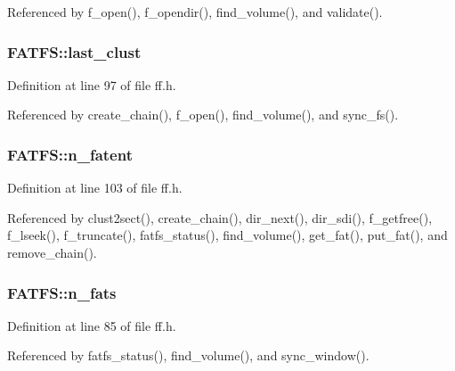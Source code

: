 Referenced by f\-\_\-open(), f\-\_\-opendir(), find\-\_\-volume(), and validate().

\hypertarget{structFATFS_ad315def289218e26ab78ff90fde700d1}{
\subsubsection[{last\-\_\-clust}]{ F\-A\-T\-F\-S\-::last\-\_\-clust}}\label{structFATFS_ad315def289218e26ab78ff90fde700d1}


Definition at line 97 of file ff.\-h.



Referenced by create\-\_\-chain(), f\-\_\-open(), find\-\_\-volume(), and sync\-\_\-fs().

\hypertarget{structFATFS_a8da50eeba6469bc20d60ca0cf9a1307c}{
\subsubsection[{n\-\_\-fatent}]{ F\-A\-T\-F\-S\-::n\-\_\-fatent}}\label{structFATFS_a8da50eeba6469bc20d60ca0cf9a1307c}


Definition at line 103 of file ff.\-h.



Referenced by clust2sect(), create\-\_\-chain(), dir\-\_\-next(), dir\-\_\-sdi(), f\-\_\-getfree(), f\-\_\-lseek(), f\-\_\-truncate(), fatfs\-\_\-status(), find\-\_\-volume(), get\-\_\-fat(), put\-\_\-fat(), and remove\-\_\-chain().

\hypertarget{structFATFS_a56716c7e7ac10cf46e73ffb2a2e9b545}{
\subsubsection[{n\-\_\-fats}]{ F\-A\-T\-F\-S\-::n\-\_\-fats}}\label{structFATFS_a56716c7e7ac10cf46e73ffb2a2e9b545}


Definition at line 85 of file ff.\-h.



Referenced by fatfs\-\_\-status(), find\-\_\-volume(), and sync\-\_\-window().

